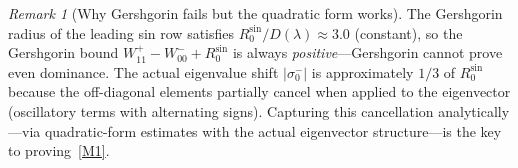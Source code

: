 \documentclass[12pt,a4paper]{article}
\theoremstyle{definition}
\theoremstyle{remark}
\newtheorem{remark}[theorem]{Remark}
\begin{document}
\begin{remark}[Why Gershgorin fails but the quadratic form works]
The Gershgorin radius of the leading sin row satisfies $R_0^{\sin}/D(\lambda) \approx 3.0$ (constant), so the Gershgorin bound $W_{11}^+ - W_{00}^- + R_0^{\sin}$ is always \emph{positive}---Gershgorin cannot prove even dominance. The actual eigenvalue shift $|\sigma_0^-|$ is approximately $1/3$ of $R_0^{\sin}$ because the off-diagonal elements partially cancel when applied to the eigenvector (oscillatory terms with alternating signs). Capturing this cancellation analytically---via quadratic-form estimates with the actual eigenvector structure---is the key to proving~\ref{M1}.
\end{remark}




\end{document}

